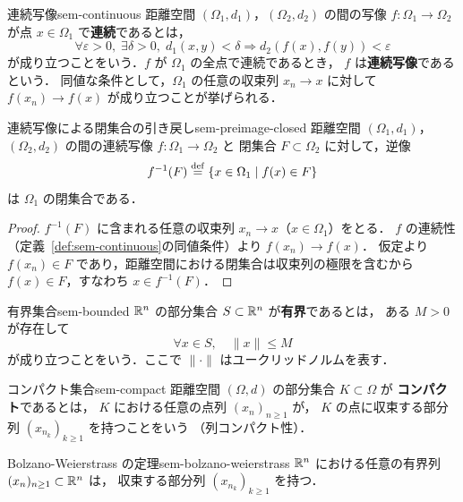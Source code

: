 \begin{definition}{連続写像}{sem-continuous}
  距離空間 $(\Omega_1, d_1)$，$(\Omega_2, d_2)$ の間の写像
  $f \colon \Omega_1 \to \Omega_2$ が点 $x \in \Omega_1$ で\textbf{連続}であるとは，
  \[
    \forall \varepsilon > 0,\; \exists \delta > 0,\;
    d_1(x, y) < \delta \Longrightarrow d_2(f(x), f(y)) < \varepsilon
  \]
  が成り立つことをいう．$f$ が $\Omega_1$ の全点で連続であるとき，
  $f$ は\textbf{連続写像}であるという．
  同値な条件として，$\Omega_1$ の任意の収束列 $x_n \to x$ に対して
  $f(x_n) \to f(x)$ が成り立つことが挙げられる．
\end{definition}

\begin{proposition}{連続写像による閉集合の引き戻し}{sem-preimage-closed}
  距離空間 $(\Omega_1, d_1)$，$(\Omega_2, d_2)$ の間の連続写像 $f \colon \Omega_1 \to \Omega_2$ と
  閉集合 $F \subset \Omega_2$ に対して，逆像
  \[
    f^{-1}(F) \overset{\mathrm{def}}{=} \{ x \in \Omega_1 \mid f(x) \in F \}
  \]
  は $\Omega_1$ の閉集合である．
\end{proposition}
\begin{proof}
  $f^{-1}(F)$ に含まれる任意の収束列 $x_n \to x$（$x \in \Omega_1$）をとる．
  $f$ の連続性（定義~\ref{def:sem-continuous}の同値条件）より $f(x_n) \to f(x)$．
  仮定より $f(x_n) \in F$ であり，距離空間における閉集合は収束列の極限を含むから
  $f(x) \in F$，すなわち $x \in f^{-1}(F)$．
\end{proof}

\begin{definition}{有界集合}{sem-bounded}
  $\mathbb{R}^n$ の部分集合 $S \subset \mathbb{R}^n$ が\textbf{有界}であるとは，
  ある $M > 0$ が存在して
  \[
    \forall x \in S,\quad \|x\| \leq M
  \]
  が成り立つことをいう．ここで $\|\cdot\|$ はユークリッドノルムを表す．
\end{definition}

\begin{definition}{コンパクト集合}{sem-compact}
  距離空間 $(\Omega, d)$ の部分集合 $K \subset \Omega$ が
  \textbf{コンパクト}であるとは，
  $K$ における任意の点列 $(x_n)_{n \geq 1}$ が，
  $K$ の点に収束する部分列 $(x_{n_k})_{k \geq 1}$ を持つことをいう
  （列コンパクト性）．
\end{definition}

\begin{claim}{Bolzano-Weierstrass の定理}{sem-bolzano-weierstrass}
  $\mathbb{R}^n$ における任意の有界列 $(x_n)_{n \geq 1} \subset \mathbb{R}^n$ は，
  収束する部分列 $(x_{n_k})_{k \geq 1}$ を持つ．
\end{claim}

